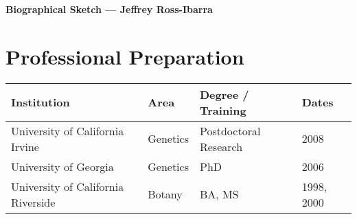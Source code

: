 \documentclass[10pt]{article}
\begin{document}
\begin{center}
		\sf\textbf{{Biographical Sketch --- Jeffrey Ross-Ibarra}}
\end{center}



\section{Professional Preparation}

\begin{tabular}{l l l l}
Institution    \hspace{52mm}              &   Area  \hspace{10mm}     & Degree / Training  \hspace{13mm}    & Dates \\
\hline
University of California Irvine & Genetics & Postdoctoral Research & 2008 \\
University of Georgia & Genetics & PhD & 2006\\
University of California Riverside & Botany & BA, MS & 1998, 2000 \\
\end{tabular}
\end{document}

